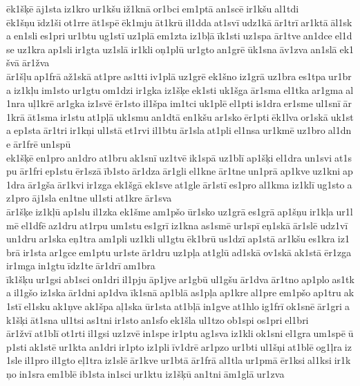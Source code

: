 ēk1šķē āj1sta iz1kro ur1kšu iž1knā or1bci em1ptā an1scē ir1kšu al1tdi 	ēk1šņu īdz1ši ot1rre āt1spē ēk1mju āt1krū il1dda at1svī udz1kā ār1trī ar1ktā āl1ska en1sli es1pri ur1btu ug1stī uz1plā em1zta iz1bļā īk1sti uz1spa ār1tve an1dce el1dse uz1kra ap1sli ir1gta uz1slā ir1kli oņ1plū ur1gto an1grē ūk1sna āv1zva an1slā ek1švā ār1žva 	ār1šļu ap1frā až1skā at1pre as1tti iv1plā uz1grē ek1šno iz1grā uz1bra es1tpa ur1bra iz1kļu im1sto ur1gtu om1dzi ir1gka iz1šķe ek1sti uk1šga ār1sma el1tka ar1gma al1nra uļ1krē ar1gka iz1svē ēr1sto il1špa im1tci uk1plē el1pti is1dra er1sme ul1snī ār1krā āt1sma ir1stu at1pļā uk1smu an1dtā en1kšu ar1sko ēr1pti ēk1lva or1skā uk1sta ep1sta ār1tri ir1kņi ul1stā et1rvi il1btu ār1sla at1pli el1nsa ur1kmē uz1bro al1dne ār1frē un1spū 	ek1šķē en1pro an1dro at1bru ak1snī uz1tvē ik1spā uz1blī ap1šķi el1dra un1svi at1spu ār1fri ep1stu ēr1szā īb1sto ār1dza ār1gli el1kne ār1tne un1prā ap1kve uz1kni ap1dra ār1gša ār1kvi ir1zga ek1šgā ek1sve at1gle ār1stī es1pro al1kma iz1klī ug1sto az1pro āj1sla en1tne ul1sti at1kre ār1sva 	ār1šķe iz1kļū ap1slu il1zka ek1šme am1pšo ūr1sko uz1grā es1grā ap1šņu ir1kļa ur1lmē el1dfē az1dru at1rpu um1stu es1grī iz1kna as1smē ur1spī eņ1skā ār1slē udz1vī un1dru ar1ska eņ1tra am1pli uz1kli ul1gtu ēk1brū us1dzī ap1stā ar1kšu es1kra iz1brā ir1sta ar1gce em1ptu ur1ste ār1dru uz1pļa at1glū ad1skā ov1skā ak1stā ēr1zga ir1mga in1gtu īdz1te ār1drī am1bra 	īk1šķu ur1gsi ab1sci on1dri il1pju āp1jve ar1gbū ul1gšu ār1dva ār1tno ap1plo as1tka il1gšo iz1ska ār1dni ap1dva īk1snā ap1blā as1pļa ap1kre al1pre em1pšo ap1tru ak1stī el1sku ak1ņve ak1špa aļ1ska ūr1sta at1bļā in1gve at1hlo ig1frī ok1snē ār1gri ak1šķi āt1sna ul1tsi as1tni ir1sto an1sfo ek1šla ul1tzo ob1spi os1pri el1bri 	ār1žvī at1blī ot1rti il1gsi uz1zvē in1spe ir1ptu ag1sva iz1kli ok1sni el1gra um1spē ūp1sti ak1stē ur1kta an1dri ir1pto iz1pli īv1drē ar1pzo ur1bti ul1šņi at1blē og1ļra iz1sle il1pro il1gto eļ1tra iz1slē ār1kve ur1btā ār1frā al1tla ur1pmā ēr1ksi al1ksi ir1kņo in1sra em1blē ib1sta in1sci ur1ktu 	iz1šķū an1tni ām1glā ur1zva 
